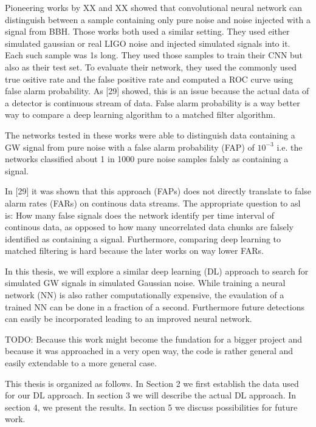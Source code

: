 Pioneering works by XX and XX showed that convolutional neural network can
distinguish between a sample containing only pure noise and noise injected
with a signal from BBH. Those works both used a similar setting. They used either
simulated gaussian or real LIGO noise and injected simulated signals into it.
Each such sample was 1s long. They used those samples to train their CNN but
also as their test set. To evaluate their network, they used the commonly used
true ositive rate and the false positive rate and computed a ROC curve using
false alarm probability. As [29] showed, this is an issue because the actual
data of a detector is continuous stream of data. False alarm probability is a
way better way to compare a deep learning algorithm to a matched filter
algorithm.

The networks tested in these works were able to distinguish
data containing a GW signal from pure noise with a false alarm probability (FAP)
of $10^{-3}$ i.e. the networks classified about 1 in 1000 pure noise samples
falsly as containing a signal.

In [29] it was shown that this approach (FAPs) does not directly translate to
false alarm rates (FARs) on continous data streams. The appropriate question to
asl is: How many false signals does the network identify per time interval of
continous data, as opposed to how many uncorrelated data chunks are falsely
identified as containing a signal. Furthermore, comparing deep learning to
matched filtering is hard because the later works on way lower FARs.


In this thesis,
we will explore a similar deep learning (DL) approach to search for simulated GW
signals in simulated Gaussian noise. While training a neural network (NN) is also
rather computationally expensive, the evaulation of a trained NN can be done in
a fraction of a second. Furthermore future detections can easily be incorporated
leading to an improved neural network.

TODO: Because this work might become the fundation for a bigger project and
because it was approached in a very open way, the code is rather general and
easily extendable to a more general case.

This thesis is organized as follows. In Section 2 we first establish the data
used for our DL approach. In section 3 we will describe the actual DL approach.
In section 4, we present the results. In section 5 we discuss possibilities for 
future work.

